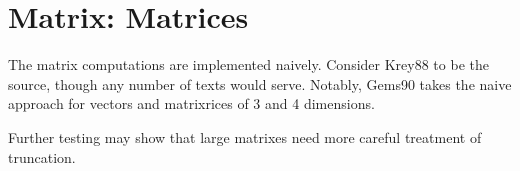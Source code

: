 \section{Matrix: Matrices}
The matrix computations are implemented naively.  Consider
Krey88 to be the source, though any number of texts would
serve.  Notably, Gems90 takes the naive approach for vectors
and matrixrices of 3 and 4 dimensions.

Further testing may show that large matrixes need more
careful treatment of truncation.
